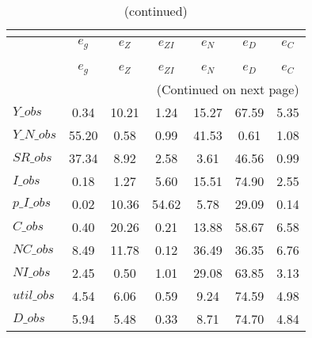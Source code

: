  
\begin{center}
\begin{longtable}{lcccccc} 
\caption{VARIANCE DECOMPOSITION (in percent)}\\
 \label{Table:th_var_decomp_uncond}\\
\toprule 
$           $	 & 	 $       {e_g}$	 & 	 $       {e_Z}$	 & 	 $    {e_{ZI}}$	 & 	 $       {e_N}$	 & 	 $       {e_D}$	 & 	 $       {e_C}$\\
\midrule \endfirsthead 
\caption{(continued)}\\
 \toprule \\ 
$           $	 & 	 $       {e_g}$	 & 	 $       {e_Z}$	 & 	 $    {e_{ZI}}$	 & 	 $       {e_N}$	 & 	 $       {e_D}$	 & 	 $       {e_C}$\\
\midrule \endhead 
\midrule \multicolumn{7}{r}{(Continued on next page)} \\ \bottomrule \endfoot 
\bottomrule \endlastfoot 
$Y\_obs     $	 & 	        0.34	 & 	       10.21	 & 	        1.24	 & 	       15.27	 & 	       67.59	 & 	        5.35 \\ 
$Y\_N\_obs  $	 & 	       55.20	 & 	        0.58	 & 	        0.99	 & 	       41.53	 & 	        0.61	 & 	        1.08 \\ 
$SR\_obs    $	 & 	       37.34	 & 	        8.92	 & 	        2.58	 & 	        3.61	 & 	       46.56	 & 	        0.99 \\ 
$I\_obs     $	 & 	        0.18	 & 	        1.27	 & 	        5.60	 & 	       15.51	 & 	       74.90	 & 	        2.55 \\ 
$p\_I\_obs  $	 & 	        0.02	 & 	       10.36	 & 	       54.62	 & 	        5.78	 & 	       29.09	 & 	        0.14 \\ 
$C\_obs     $	 & 	        0.40	 & 	       20.26	 & 	        0.21	 & 	       13.88	 & 	       58.67	 & 	        6.58 \\ 
$NC\_obs    $	 & 	        8.49	 & 	       11.78	 & 	        0.12	 & 	       36.49	 & 	       36.35	 & 	        6.76 \\ 
$NI\_obs    $	 & 	        2.45	 & 	        0.50	 & 	        1.01	 & 	       29.08	 & 	       63.85	 & 	        3.13 \\ 
$util\_obs  $	 & 	        4.54	 & 	        6.06	 & 	        0.59	 & 	        9.24	 & 	       74.59	 & 	        4.98 \\ 
$D\_obs     $	 & 	        5.94	 & 	        5.48	 & 	        0.33	 & 	        8.71	 & 	       74.70	 & 	        4.84 \\ 

\end{longtable}
\end{center}
